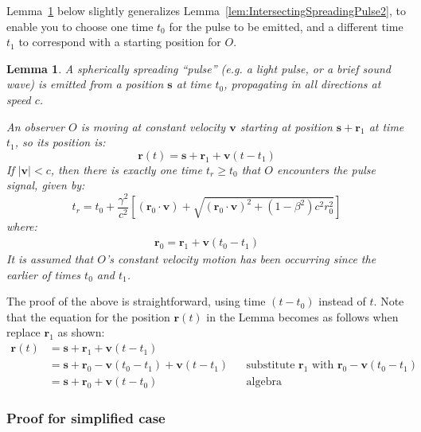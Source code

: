 \documentclass[a4paper]{article}
\theoremstyle{plain}
\newtheorem{lemma}[theorem]{Lemma}
\theoremstyle{definition}
\newcommand{\vect}[1]{\mathbf{#1}}
\begin{document}
Lemma~\ref{lem:IntersectingSpreadingPulse} below slightly generalizes
Lemma~\ref{lem:IntersectingSpreadingPulse2}, to enable you to choose
one time $t_0$ for the pulse to be emitted, and a different time $t_1$
to correspond with a starting position for $O$.
\begin{lemma}
\label{lem:IntersectingSpreadingPulse}
A spherically spreading ``pulse'' (e.g. a light pulse, or a brief
sound wave) is emitted from a position $\vect{s}$ at time $t_0$,
propagating in all directions at speed $c$.

An observer $O$ is moving at constant velocity $\vect{v}$ starting at
position $\vect{s} + \vect{r}_1$ at time $t_1$, so its position is:
\begin{equation}
\vect{r}(t) = \vect{s} + \vect{r}_1 + \vect{v}(t - t_1)
\end{equation}
If $|\vect{v}| < c$, then there is exactly one time $t_r \geq t_0$
that $O$ encounters the pulse signal, given by:
\begin{equation}
t_r = t_0 + \frac{\gamma^2}{c^2} \left[ (\vect{r}_0 \cdot \vect{v}) + \sqrt{(\vect{r}_0 \cdot \vect{v})^2 + (1-\beta^2)c^2 r_0^2} \right]
\end{equation}
where:
\begin{align*}
\vect{r}_0 = \vect{r}_1 + \vect{v}(t_0-t_1)
\end{align*}
It is assumed that $O$'s constant velocity motion has been occurring
since the earlier of times $t_0$ and $t_1$.
\end{lemma}

The proof of the above is straightforward, using time $(t-t_0)$
instead of $t$.  Note that the equation for the position $\vect{r}(t)$
in the Lemma becomes as follows when replace $\vect{r}_1$ as shown:
\begin{align*}
\vect{r}(t)
  & = \vect{s} + \vect{r}_1 + \vect{v}(t - t_1) \\
  & = \vect{s} + \vect{r}_0 - \vect{v}(t_0-t_1) + \vect{v}(t - t_1) & & \text{substitute $\vect{r}_1$ with $\vect{r}_0 - \vect{v}(t_0-t_1)$} \\
  & = \vect{s} + \vect{r}_0 + \vect{v}(t - t_0) & & \text{algebra}
\end{align*}


\subsubsection{Proof for simplified case}
\end{document}
